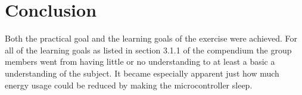\chapter{Conclusion}
Both the practical goal and the learning goals of the exercise were achieved. For all of the learning goals as listed in section 3.1.1 of the compendium\cite{compendium} the group members went from having little or no understanding to at least a basic a understanding of the subject. It became especially apparent just how much energy usage could be reduced by making the microcontroller sleep.
